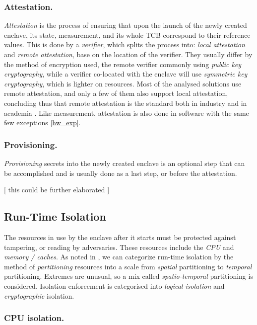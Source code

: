 \documentclass[runningheads,a4paper]{uwsese}
\begin{document}
\subsubsection{Attestation.}

\emph{Attestation} is the process of ensuring that upon the launch of the newly
created enclave, its state, measurement, and its whole TCB correspond to their
reference values. This is done by a \emph{verifier}, which splits the process
into: \emph{local attestation} and \emph{remote attestation}, base on the
location of the verifier. They usually differ by the method of encryption used,
the remote verifier commonly using \emph{public key cryptography}, while a
verifier co-located with the enclave will use \emph{symmetric key
cryptography}, which is lighter on resources. Most of the analysed solutions
use remote attestation, and only a few of them also support local attestation,
concluding thus that remote attestation is the standard both in industry and in
academia \cite{tee_hw_sup}. Like measurement, attestation is also done in
software with the same few exceptions \ref{hw_exp}.

\subsubsection{Provisioning.}

\emph{Provisioning} secrets into the newly created enclave is an optional step
that can be accomplished and is usually done as a last step, or before the
attestation. \cite{tee_hw_sup} %

[ this could be further elaborated ]

\subsection{Run-Time Isolation}

The resources in use by the enclave after it starts must be protected against
tampering, or reading by adversaries. These resources include the \emph{CPU}
and \emph{memory / caches}. As noted in \cite{tee_hw_sup}, we can categorize run-time
isolation by the method of \emph{partitioning} resources into a scale from
\emph{spatial} partitioning to \emph{temporal} partitioning. Extremes are
unusual, so a mix called \emph{spatio-temporal} partitioning is considered.
Isolation enforcement is categorised into \emph{logical isolation} and
\emph{cryptographic} isolation.

\subsubsection{CPU isolation.}
\end{document}
